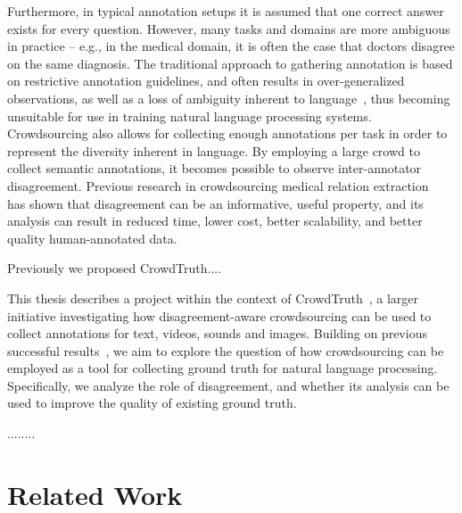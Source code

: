 Furthermore, in typical annotation setups it is assumed that one correct answer exists for every question. However, many tasks and domains are more ambiguous in practice -- e.g., in the medical domain, it is often the case that doctors disagree on the same diagnosis. The traditional approach to gathering annotation is based on restrictive annotation guidelines, and often results in over-generalized observations, as well as a loss of ambiguity inherent to language~\cite{aroyo2012harnessing}, thus becoming unsuitable for use in training natural language processing systems. Crowdsourcing also allows for collecting enough annotations per task in order to represent the diversity inherent in language. By employing a large crowd to collect semantic annotations, it becomes possible to observe inter-annotator disagreement. Previous research in crowdsourcing medical relation extraction~\cite{aroyo2013crowd,aroyo2013measuring} has shown that disagreement can be an informative, useful property, and its analysis can result in reduced time, lower cost, better scalability, and better quality human-annotated data.

Previously we proposed CrowdTruth....

This thesis describes a project within the context of CrowdTruth~\cite{inel2013}, a larger initiative investigating how disagreement-aware crowdsourcing can be used to collect annotations for text, videos, sounds and images. Building on previous successful results~\cite{aroyo2013crowd,aroyo2013measuring}, we aim to explore the question of how crowdsourcing can be employed as a tool for collecting ground truth for natural language processing. Specifically, we analyze the role of disagreement, and whether its analysis can be used to improve the quality of existing ground truth.

........







\section{Related Work}

